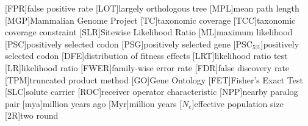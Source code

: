 
[FPR]{false positive rate}
[LOT]{largely orthologous tree}
[MPL]{mean path length}
[MGP]{Mammalian Genome Project}
[TC]{taxonomic coverage}
[TCC]{taxonomic coverage constraint}
[SLR]{Sitewise Likelihood Ratio}
[ML]{maximum likelihood}
[PSC]{positively selected codon}
[PSG]{positively selected gene}
[PSC$_{5\%}$]{positively selected codon}
[DFE]{distribution of fitness effects}
[LRT]{likelihood ratio test}
[LR]{likelihood ratio}
[FWER]{family-wise error rate}
[FDR]{false discovery rate}
[TPM]{truncated product method}
[GO]{Gene Ontology}
[FET]{Fisher's Exact Test}
[SLC]{solute carrier}
[ROC]{receiver operator characteristic}
[NPP]{nearby paralog pair}
[mya]{million years ago}
[Myr]{million years}
[$N_{e}$]{effective population size}
[2R]{two round}

\newcommand{\tocite}[2]{}

\newcommand{\TODO}[1]{\textcolor{red}{TODO} \todo{#1}\xspace}
\newcommand{\draft}[1]{\textcolor{gray}{[#1]}\xspace}

\newcommand{\gene}[1]{\emph{#1}}
\newcommand{\species}[1]{\emph{#1}}

\newcommand{\syn}{synonymous\xspace}
\newcommand{\nsyn}{nonsynonymous\xspace}

\newcommand{\sw}{sitewise\xspace}
\newcommand{\ml}{maximum likelihood\xspace}

\newcommand{\slr}{SLR\xspace}
\newcommand{\pamlTwo}{PAML M2\xspace}
\newcommand{\pamlEight}{PAML M8\xspace}

\newcommand{\fpr}{FPR\xspace}
\newcommand{\pss}{PSS\xspace}
\newcommand{\psg}{PSG\xspace}

\newcommand{\mtwo}{PAML M2a\xspace}
\newcommand{\meight}{PAML M8\xspace}
\newcommand{\pranka}{PRANK$_{\textrm{AA}}$\xspace}
\newcommand{\prankc}{PRANK$_{\textrm{C}}$\xspace}
\newcommand{\tpr}{TPR$_{1\%}$\xspace}
\newcommand{\tprf}{TPR$_{5\%}$\xspace}
\newcommand{\Sw}{Sitewise\xspace}
\newcommand{\Dr}{{\emph{Drosophila}}\xspace}
\newcommand{\tcr}[1]{#1}
\newcommand{\tcrr}[1]{#1}
\newcommand{\nh}{non-homologous\xspace}
\newcommand{\hidegraphics}[2]{\texttt{[image: \#2]}}


